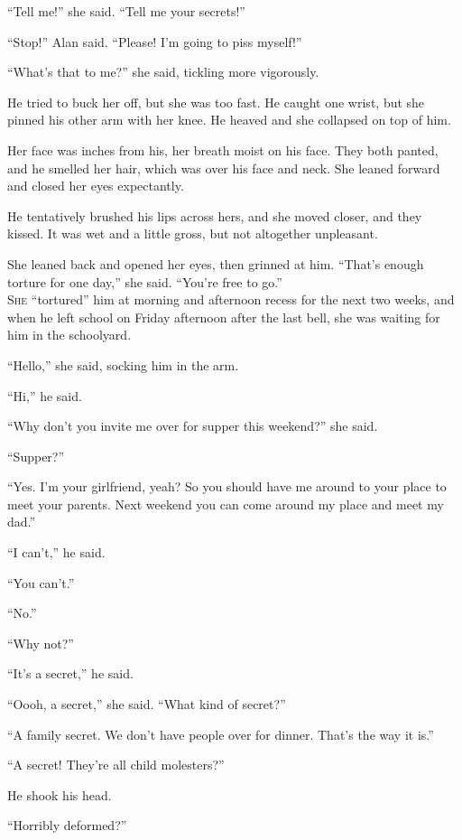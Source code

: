 ``Tell me!'' she said.  ``Tell me your secrets!''

``Stop!'' Alan said.  ``Please!  I'm going to piss myself!''

``What's that to me?'' she said, tickling more vigorously.

He tried to buck her off, but she was too fast.  He caught one wrist,
but she pinned his other arm with her knee.  He heaved and she
collapsed on top of him.

Her face was inches from his, her breath moist on his face.  They both
panted, and he smelled her hair, which was over his face and neck. 
She leaned forward and closed her eyes expectantly.

He tentatively brushed his lips across hers, and she moved closer, and
they kissed.  It was wet and a little gross, but not altogether
unpleasant.

She leaned back and opened her eyes, then grinned at him.  ``That's
enough torture for one day,'' she said.  ``You're free to go.''
\\
\lettrine[lines=3, lhang=.5, nindent=0pt, findent=2pt]{S}{he} ``tortured'' him at morning and afternoon recess for the next two
weeks, and when he left school on Friday afternoon after the last
bell, she was waiting for him in the schoolyard.

``Hello,'' she said, socking him in the arm.

``Hi,'' he said.

``Why don't you invite me over for supper this weekend?'' she said.

``Supper?''

``Yes.  I'm your girlfriend, yeah?  So you should have me around to
your place to meet your parents.  Next weekend you can come around my
place and meet my dad.''

``I can't,'' he said.

``You can't.''

``No.''

``Why not?''

``It's a secret,'' he said.

``Oooh, a secret,'' she said.  ``What kind of secret?''

``A family secret.  We don't have people over for dinner.  That's the
way it is.''

``A secret!  They're all child molesters?''

He shook his head.

``Horribly deformed?''

